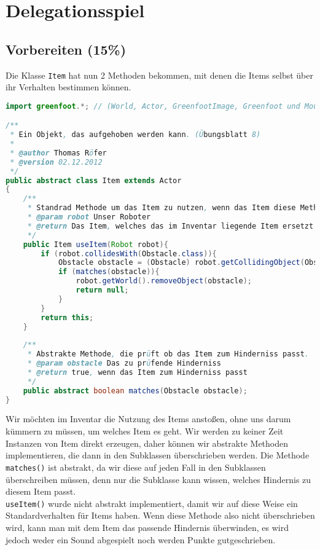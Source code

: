 \documentclass{pi1}
\begin{document}
\section{Delegationsspiel}

\subsection{Vorbereiten (15\%)}

Die Klasse  \texttt{Item} hat nun 2 Methoden bekommen, mit denen die Items selbst über ihr Verhalten bestimmen können.
\begin{lstlisting}[caption={Klasse \emph{Item}}, firstnumber=1, language=Java]
import greenfoot.*; // (World, Actor, GreenfootImage, Greenfoot und MouseInfo)

/**
 * Ein Objekt, das aufgehoben werden kann. (Übungsblatt 8)
 * 
 * @author Thomas Röfer
 * @version 02.12.2012
 */
public abstract class Item extends Actor
{
    /**
     * Standrad Methode um das Item zu nutzen, wenn das Item diese Methode nicht überschreibt
     * @param robot Unser Roboter
     * @return Das Item, welches das im Inventar liegende Item ersetzt
     */
    public Item useItem(Robot robot){
        if (robot.collidesWith(Obstacle.class)){
            Obstacle obstacle = (Obstacle) robot.getCollidingObject(Obstacle.class);
            if (matches(obstacle)){
                robot.getWorld().removeObject(obstacle);
                return null;
            }
        }
        return this;
    }
    
    /**
     * Abstrakte Methode, die prüft ob das Item zum Hinderniss passt.
     * @param obstacle Das zu prüfende Hinderniss
     * @return true, wenn das Item zum Hinderniss passt
     */
    public abstract boolean matches(Obstacle obstacle);
}

\end{lstlisting}

Wir möchten im Inventar die Nutzung des Items anstoßen, ohne uns darum kümmern zu müssen, um welches Item es geht.
Wir werden zu keiner Zeit Instanzen von Item direkt erzeugen, daher können wir abstrakte Methoden implementieren, die dann in den Subklassen überschrieben werden. Die Methode \texttt{matches()} ist abstrakt, da wir diese auf jeden Fall in den Subklassen überschreiben müssen, denn nur die Subklasse kann wissen, welches Hindernis zu diesem Item passt.\\
\texttt{useItem()} wurde nicht abstrakt implementiert, damit wir auf diese Weise ein Standardverhalten für Items haben. Wenn diese Methode also nicht überschrieben wird, kann man mit dem Item das passende Hindernis überwinden, es wird jedoch weder ein Sound abgespielt noch werden Punkte gutgeschrieben.
\end{document}
